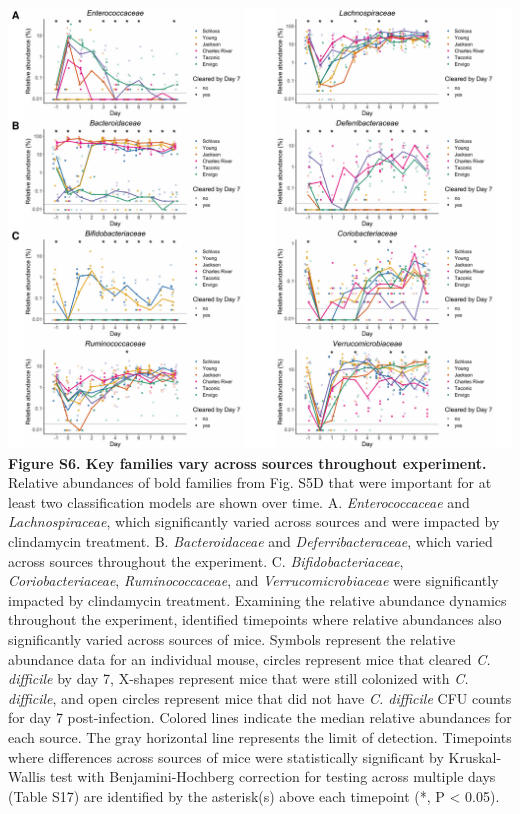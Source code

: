 \documentclass[11pt,]{article}
\begin{document}
\includegraphics{figure_S6.pdf} \textbf{Figure S6. Key families vary
across sources throughout experiment.} Relative abundances of bold
families from Fig. S5D that were important for at least two
classification models are shown over time. A. \emph{Enterococcaceae} and
\emph{Lachnospiraceae}, which significantly varied across sources and
were impacted by clindamycin treatment. B. \emph{Bacteroidaceae} and
\emph{Deferribacteraceae}, which varied across sources throughout the
experiment. C. \emph{Bifidobacteriaceae}, \emph{Coriobacteriaceae},
\emph{Ruminococcaceae}, and \emph{Verrucomicrobiaceae} were
significantly impacted by clindamycin treatment. Examining the relative
abundance dynamics throughout the experiment, identified timepoints
where relative abundances also significantly varied across sources of
mice. Symbols represent the relative abundance data for an individual
mouse, circles represent mice that cleared \emph{C. difficile} by day 7,
X-shapes represent mice that were still colonized with \emph{C.
difficile}, and open circles represent mice that did not have \emph{C.
difficile} CFU counts for day 7 post-infection. Colored lines indicate
the median relative abundances for each source. The gray horizontal line
represents the limit of detection. Timepoints where differences across
sources of mice were statistically significant by Kruskal-Wallis test
with Benjamini-Hochberg correction for testing across multiple days
(Table S17) are identified by the asterisk(s) above each timepoint (*, P
\textless{} 0.05).
\end{document}
